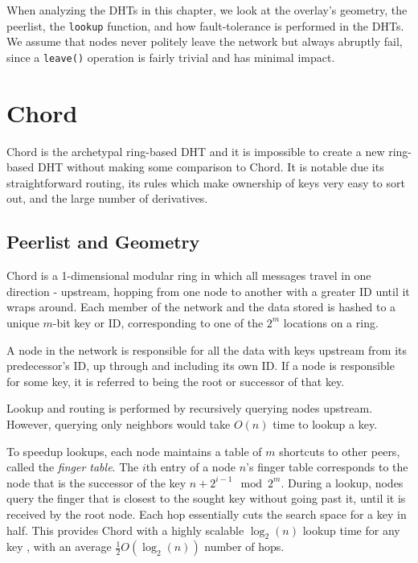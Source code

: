 When analyzing the DHTs in this chapter, we look at the overlay's geometry, the peerlist, the \texttt{lookup} function, and how fault-tolerance is performed in the DHTs.
We assume that nodes never politely leave the network but always abruptly fail, since a \texttt{leave()} operation is fairly trivial and has minimal impact.


\section{Chord}

Chord \cite{chord} is the archetypal ring-based DHT and it is impossible to create a new ring-based DHT without making some comparison to Chord.
It is notable due its straightforward routing, its rules which make ownership of keys very easy to sort out, and the large number of derivatives.


\subsection*{Peerlist and Geometry}
Chord is a 1-dimensional modular ring in which all messages travel in one direction - upstream, hopping from one node to another with a greater ID until it wraps around.
Each member of the network and the data stored is hashed to a unique $m$-bit key or ID, corresponding to one of the $2^m$ locations on a ring. 

A node in the network is responsible for all the data with keys upstream from its predecessor's ID, up through and including its own ID.  
If a node is responsible for some key, it is referred to being the root or successor of that key.

Lookup and routing is performed by recursively querying nodes upstream.
However, querying only neighbors would take $O(n)$ time to lookup a key.


To speedup lookups, each node maintains a table of $m$ shortcuts to other peers, called the \textit{finger table}.
The $i$th entry of a node $n$'s finger table corresponds to the node that is the successor of the key $n+2^{i-1} \mod 2^m $.  
During a lookup,  nodes query the finger that is closest to the sought key without going past it, until it is received by the root node.
Each hop essentially cuts the search space for a key in half.
This provides Chord with a highly scalable $\log_2(n)$ lookup time for any key \cite{chord}, with an average $\frac{1}{2}O(\log_{2}(n))$ number of hops.

